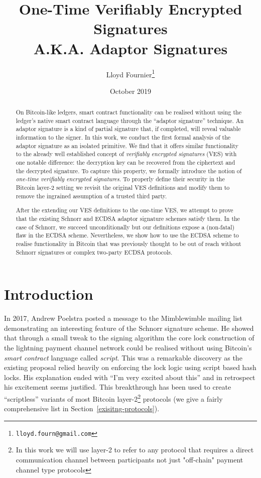 \documentclass[fullpage]{article}
\theoremstyle{definition}
\begin{document}
\title{One-Time Verifiably Encrypted Signatures \\ A.K.A. Adaptor Signatures}
\author{Lloyd Fournier\footnote{\texttt{lloyd.fourn@gmail.com}}}
\date{October 2019}

\maketitle

\begin{abstract}
  On Bitcoin-like ledgers, smart contract functionality can be realised without using the ledger's native smart contract language through the ``adaptor signature'' technique\cite{poelstra-adaptor}. An adaptor signature is a kind of partial signature that, if completed, will reveal valuable information to the signer. In this work, we conduct the first formal analysis of the adaptor signature as an isolated primitive. We find that it offers similar functionality to the already well established concept of \emph{verifiably encrypted signatures} (VES) with one notable difference: the decryption key can be recovered from the ciphertext and the decrypted signature. To capture this property, we formally introduce the notion of \emph{one-time verifiably encrypted signatures}. To properly define their security in the Bitcoin layer-2 setting we revisit the original VES definitions and modify them to remove the ingrained assumption of a trusted third party.

  After the extending our VES definitions to the one-time VES, we attempt to prove that the existing Schnorr and ECDSA adaptor signature schemes satisfy them. In the case of Schnorr, we succeed unconditionally but our definitions expose a (non-fatal) flaw in the ECDSA scheme. Nevertheless, we show how to use the ECDSA scheme to realise functionality in Bitcoin that was previously thought to be out of reach without Schnorr signatures or complex two-party ECDSA protocols.
\end{abstract}

\section{Introduction}

In 2017, Andrew Poelstra posted a message to the Mimblewimble mailing list\cite{poelstra-bitcoin-dev-scriptless} demonstrating an interesting feature of the Schnorr signature scheme. He showed that through a small tweak to the signing algorithm the core lock construction of the lightning payment channel network\cite{poon2016bitcoin} could be realised without using Bitcoin's \emph{smart contract} language called \emph{script}. This was a remarkable discovery as the existing proposal relied heavily on enforcing the lock logic using script based hash locks. His explanation ended with ``I'm very excited about this'' and in retrospect his excitement seems justified. This breakthrough has been used to create ``scriptless'' variants of most Bitcoin layer-2\footnote{In this work we will use layer-2 to refer to any protocol that requires a direct communication channel between participants not just "off-chain" payment channel type protocols} protocols (we give a fairly comprehensive list in Section~\ref{exisitng-protocols}).
\end{document}

